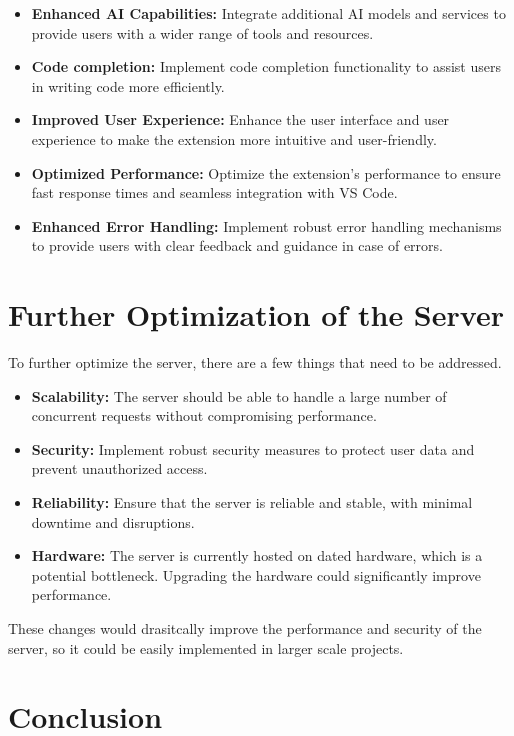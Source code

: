\begin{itemize}
    \item \textbf{Enhanced AI Capabilities:} Integrate additional AI models and services to provide users with a wider range of tools and resources.
    \item \textbf{Code completion:} Implement code completion functionality to assist users in writing code more efficiently.
    \item \textbf{Improved User Experience:} Enhance the user interface and user experience to make the extension more intuitive and user-friendly.
    \item \textbf{Optimized Performance:} Optimize the extension’s performance to ensure fast response times and seamless integration with VS Code.
    \item \textbf{Enhanced Error Handling:} Implement robust error handling mechanisms to provide users with clear feedback and guidance in case of errors.
\end{itemize} 

\section{Further Optimization of the Server}

To further optimize the server, there are a few things that need to be addressed.

\begin{itemize}
    \item \textbf{Scalability:} The server should be able to handle a large number of concurrent requests without compromising performance.
    \item \textbf{Security:} Implement robust security measures to protect user data and prevent unauthorized access.
    \item \textbf{Reliability:} Ensure that the server is reliable and stable, with minimal downtime and disruptions.
    \item \textbf{Hardware:} The server is currently hosted on dated hardware, which is a potential bottleneck. Upgrading the hardware could significantly improve performance.
\end{itemize}

These changes would drasitcally improve the performance and security of the server, so it could be easily implemented in larger scale projects. 

\section{Conclusion}

